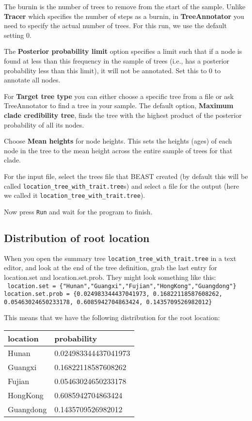 \documentclass{article}
\newcommand{\LocationTree}{{\texttt{location\_tree\_with\_trait.tree}}}
\begin{document}
The burnin is the number of trees to remove from the start of the sample. Unlike {\bf Tracer} which specifies the number of steps as a burnin, in {\bf TreeAnnotator} you need to specify the actual number of trees. For this run, we use the default setting 0.

The {\bf Posterior probability limit} option specifies a limit such that if a node is found at less than this frequency in the sample of trees (i.e., has a posterior probability less than this limit), it will not be annotated. 
Set this to 0 to annotate all nodes.

For {\bf Target tree type} you can either choose a specific tree from a file or ask TreeAnnotator to find a tree in your sample. The default option, {\bf Maximum clade credibility tree}, finds the tree with the highest product of the posterior probability of all its nodes.

Choose {\bf Mean heights} for node heights. This sets the heights (ages) of each node in the tree to the mean height across the entire sample of trees for that clade.

For the input file, select the trees file that BEAST created (by default this will be called \LocationTree{}s) and select a file for the output (here we called it \LocationTree{}).

Now press \texttt{Run} and wait for the program to finish.

\subsection*{Distribution of root location}

When you open the summary tree \LocationTree{} in a text editor, and look at the end of the tree definition, grab the last entry for location.set and location.set.prob. They might look something like this:
\\
{\tt
location.set = \{"Hunan","Guangxi","Fujian","HongKong","Guangdong"\}
location.set.prob = \{0.024983344437041973, 0.16822118587608262, 0.05463024650233178, 0.6085942704863424, 0.1435709526982012\}
}

This means that we have the following distribution for the root location:

\begin{tabular}{l|l}
\hline
location & probability\\
\hline
Hunan&0.024983344437041973\\
Guangxi&0.16822118587608262\\
Fujian&0.05463024650233178\\
HongKong&0.6085942704863424\\
Guangdong&0.1435709526982012\\
\hline
\end{tabular}
\end{document}
